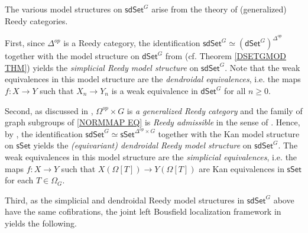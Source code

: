 \documentclass[a4paper,10pt]{article}%
\numberwithin{equation}{section}
\numberwithin{figure}{section}
\theoremstyle{definition} %
\newcommand{\dSet}{\mathsf{dSet}}
\newcommand{\1}{\ensuremath{\mathbbm 1}}%
\begin{document}
The various model structures on $\mathsf{sdSet}^G$ arise
from the theory of (generalized) Reedy categories.


First, since $\Delta^{op}$ is a Reedy category,
the identification
$\mathsf{sdSet}^G \simeq 
\left(\mathsf{dSet}^G\right)^{\Delta^{op}}$
together with the model structure on 
$\mathsf{dSet}^G$ from \cite{Per18}
(cf. Theorem \ref{DSETGMOD THM})
yields the 
\textit{simplicial Reedy model structure} on $\mathsf{sdSet}^G$.
Note that the weak equivalences in this model structure
are the \textit{dendroidal equivalences},
i.e. the maps
$f \colon X \to Y$
such that $X_n \to Y_n$ is a weak equivalence in $\dSet^G$ for all $n \geq 0$.

Second, as discussed in 
\cite[Ex. A.7]{BP_edss},
$\Omega^{op} \times G$ is \emph{a generalized Reedy category}
and the family of graph subgroups of \eqref{NORMMAP EQ} is
\emph{Reedy admissible}
in the sense of \cite[Ex. A.2]{BP_edss}.
Hence, by \cite[Thm. A.8]{BP_edss},
the identification 
$\mathsf{sdSet}^G \simeq 
\mathsf{sSet}^{\Delta^{op} \times G}$
together with the Kan model structure on 
$\mathsf{sSet}$
yields the 
\textit{(equivariant) dendroidal Reedy model structure} on $\mathsf{sdSet}^G$.
The weak equivalences in this model structure are the
\emph{simplicial equivalences},
i.e. the maps $f \colon X \to Y$
such that 
$X(\Omega[T]) \to Y(\Omega[T])$
are Kan equivalences in $\mathsf{sSet}$
for each $T \in \Omega_G$.

Third, as the simplicial and dendroidal Reedy model structures
in $\mathsf{sdSet}^G$ above have the same cofibrations,
the joint left Bousfield localization framework in 
\cite[\S 4.1]{BP_edss}
yields the following.
\end{document}
